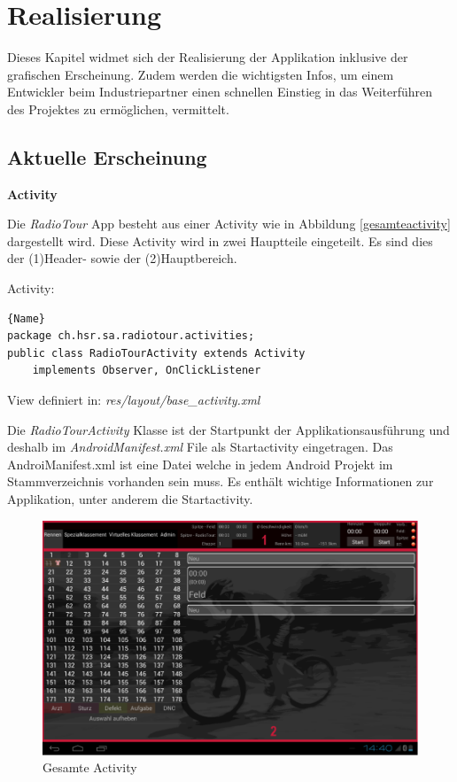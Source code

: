 \chapter{Realisierung}
\label{ref:realisierung}
Dieses Kapitel widmet sich der Realisierung der Applikation inklusive der grafischen Erscheinung. Zudem werden die wichtigsten Infos, um einem Entwickler beim Industriepartner einen schnellen Einstieg in das Weiterführen des Projektes zu ermöglichen, vermittelt.


\section{Aktuelle Erscheinung}
\textbf{Activity}

Die \textit{RadioTour} App besteht aus einer Activity wie in Abbildung \ref{gesamteactivity} dargestellt wird. Diese Activity wird in zwei Hauptteile eingeteilt. Es sind dies der (1)Header- sowie der (2)Hauptbereich. 

Activity:
\begin{lstlisting}{Name}
package ch.hsr.sa.radiotour.activities;
public class RadioTourActivity extends Activity 
	implements Observer, OnClickListener
\end{lstlisting}


View definiert in:
\textit{res/layout/base\_activity.xml}

Die \textit{RadioTourActivity} Klasse ist der Startpunkt der Applikationsausführung und deshalb im \textit{AndroidManifest.xml} File als Startactivity eingetragen. Das AndroiManifest.xml ist eine Datei welche in jedem Android Projekt im Stammverzeichnis vorhanden sein muss. Es enthält wichtige Informationen zur Applikation, unter anderem die Startactivity.


\begin{figure}[h!]
\caption{Gesamte Activity}
\label{fig:gesamteactivity}
\centering
\includegraphics[scale=0.8]{07anhang/images/dev_activity.png}
\end{figure}

